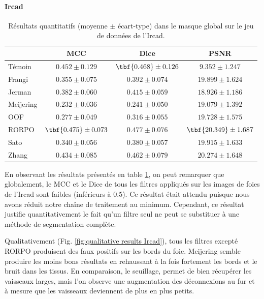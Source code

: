 \paragraph{Ircad}
\begin{table}[!ht]
  \begin{center}
      \caption{Résultats quantitatifs (moyenne $\pm$ écart-type) dans le masque global \maskglobal sur le jeu de données de l'Ircad.}
      \label{tab:quantitative results Ircad}
      \begin{tabular}{lccc}
          \hline
          & MCC & Dice & PSNR \\ 
          \hline
          Témoin	    & $ 0.452 \pm 0.129	$ & $ \tbf{0.468} \pm	0.126 $ & $	9.352  \pm  1.247 $ \\
          Frangi	    & $ 0.355 \pm 0.075	$ & $ 0.392 \pm	0.074 $ & $	19.899 \pm 	1.624 $ \\
          Jerman	    & $ 0.382 \pm 0.060	$ & $ 0.415 \pm	0.059 $ & $	18.926 \pm 	1.186 $ \\
          Meijering   & $ 0.232 \pm 0.036	$ & $ 0.241 \pm	0.050 $ & $	19.079 \pm 	1.392 $ \\
          OOF	        & $ 0.277 \pm 0.049	$ & $ 0.316 \pm	0.055 $ & $	19.728 \pm 	1.575 $ \\
          RORPO	      & $ \tbf{0.475} \pm 0.073	$ & $ 0.477 \pm	0.076 $ & $	\tbf{20.349} \pm 	1.687 $ \\
          Sato	      & $ 0.340 \pm 0.056	$ & $ 0.380 \pm	0.057 $ & $	19.915 \pm 	1.633 $ \\
          Zhang	      & $ 0.434 \pm 0.085	$ & $ 0.462 \pm	0.079 $ & $	20.274 \pm 	1.648 $ \\
    
          \hline
      \end{tabular}  
      \end{center}    
\end{table}
En observant les résultats présentés en table \ref{tab:quantitative results Ircad}, on peut remarquer que globalement, le MCC et le Dice de tous les filtres appliqués sur les images de foies de l'Ircad sont faibles (inférieurs à 0.5). Ce résultat était attendu puisque nous avons réduit notre chaîne de traitement au minimum. Cependant, ce résultat justifie quantitativement le fait qu'un filtre seul ne peut se substituer à une méthode de segmentation complète.

Qualitativement (Fig. \ref{fig:qualitative results Ircad}), tous les filtres excepté RORPO produisent des faux positifs sur les bords du foie. Meijering semble produire les moins bons résultats en rehaussant à la fois fortement les bords et le bruit dans les tissus. En comparaison, le seuillage, permet de bien récupérer les vaisseaux larges, mais l'on observe une augmentation des déconnexions au fur et à mesure que les vaisseaux deviennent de plus en plus petits. 

